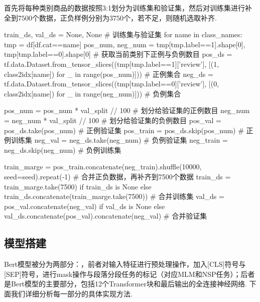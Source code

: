 \documentclass[12pt, a4paper, oneside]{ctexart}
\numberwithin{equation}{section}  %
\begin{document}
首先将每种类别商品的数据按照3:1划分为训练集和验证集，然后对训练集进行补全到$7500$个数据，正负样例分别为$3750$个，若不足，则随机选取补齐.
\begin{pythoncode}
train_ds, val_ds = None, None  # 训练集与验证集
for name in class_names:
    tmp = df[df.cat==name]
    pos_num, neg_num = tmp[tmp.label==1].shape[0], tmp[tmp.label==0].shape[0]  # 获取当前类别下正例与负例数目
    pos_ds = tf.data.Dataset.from_tensor_slices((tmp[tmp.label==1]['review'], [(1, class2idx[name]) for _ in range(pos_num)]))  # 正例集合
    neg_ds = tf.data.Dataset.from_tensor_slices((tmp[tmp.label==0]['review'], [(0, class2idx[name]) for _ in range(neg_num)]))  # 负例集合
    
    pos_num = pos_num * val_split // 100  # 划分给验证集的正例数目
    neg_num = neg_num * val_split // 100  # 划分给验证集的负例数目
    pos_val = pos_ds.take(pos_num)  # 正例验证集
    pos_train = pos_ds.skip(pos_num)  # 正例训练集
    neg_val = neg_ds.take(neg_num)  # 负例验证集
    neg_train = neg_ds.skip(neg_num)  # 负例训练集
    
    train_marge = pos_train.concatenate(neg_train).shuffle(10000, seed=seed).repeat(-1)  # 合并正负数据，再补齐到7500个数据
    train_ds = train_marge.take(7500) if train_ds is None else train_ds.concatenate(train_marge.take(7500))  # 合并训练集
    val_ds = pos_val.concatenate(neg_val) if val_ds is None else val_ds.concatenate(pos_val).concatenate(neg_val)  # 合并验证集
\end{pythoncode}
\vspace{-0.5cm}
\subsection{模型搭建}
Bert模型被分为两部分：，前者对输入特征进行预处理操作，加入[CLS]符号与[SEP]符号，进行mask操作与段落分段任务的标记（对应MLM和NSP任务）；后者是Bert模型的主要部分，包括12个Transformer块和最后输出的全连接神经网络. 下面我们详细分析每一部分的具体实现方法.
\end{document}
